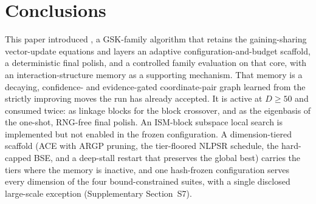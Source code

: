 \section{Conclusions}\label{sec:conclusions}

This paper introduced \dtgsk{}, a GSK-family algorithm that retains the
gaining-sharing vector-update equations and layers an adaptive configuration-and-budget
scaffold, a deterministic final polish, and a controlled family evaluation on that
core, with an interaction-structure memory as a supporting mechanism. %
That memory is a decaying, confidence- and evidence-gated
coordinate-pair graph learned from the strictly improving moves the run
has already accepted. It is active at $D \geq 50$ and consumed
twice: as linkage blocks for the block crossover, and as the eigenbasis of
the one-shot, RNG-free final polish. An ISM-block subspace local search is
implemented but not enabled in the frozen configuration. %
A dimension-tiered scaffold (ACE with ARGP pruning, the tier-floored
NLPSR schedule, the hard-capped BSE, and a deep-stall restart that
preserves the global best) carries the tiers where the memory is
inactive, and one hash-frozen configuration serves every dimension of
the four bound-constrained suites, with a single disclosed large-scale
exception
(Supplementary Section~S7). %

